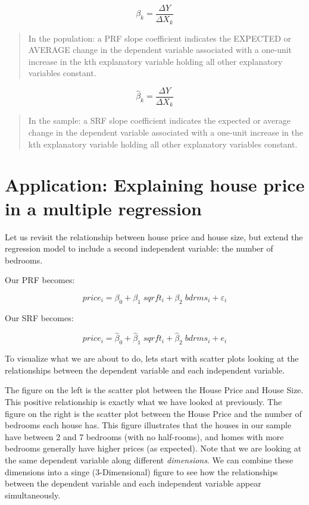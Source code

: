 \documentclass[
]{book}
\begin{document}
\[\beta_k=\frac{\Delta Y}{\Delta X_{k}}\]

\begin{quote}
In the population: a PRF slope coefficient indicates the EXPECTED or AVERAGE change in the dependent variable associated with a one-unit increase in the kth explanatory variable holding all other explanatory variables constant.
\end{quote}

\[\hat{\beta}_k=\frac{\Delta Y}{\Delta X_{k}}\]

\begin{quote}
In the sample: a SRF slope coefficient indicates the expected or average change in the dependent variable associated with a one-unit increase in the kth explanatory variable holding all other explanatory variables constant.
\end{quote}

\section{Application: Explaining house price in a multiple regression}\label{application-explaining-house-price-in-a-multiple-regression}

Let us revisit the relationship between house price and house size, but extend the regression model to include a second independent variable: the number of bedrooms.

Our PRF becomes:

\[price_i=\beta_0+\beta_1 \;sqrft_i+\beta_2 \;bdrms_i+\varepsilon_i\]

Our SRF becomes:

\[price_i=\hat{\beta}_0+\hat{\beta}_1 \;sqrft_i+\hat{\beta}_2 \;bdrms_i+e_i\]

To visualize what we are about to do, lets start with scatter plots looking at the relationships between the dependent variable and each independent variable.

The figure on the left is the scatter plot between the House Price and House Size. This positive relationship is exactly what we have looked at previously. The figure on the right is the scatter plot between the House Price and the number of bedrooms each house has. This figure illustrates that the houses in our sample have between 2 and 7 bedrooms (with no half-rooms), and homes with more bedrooms generally have higher prices (as expected). Note that we are looking at the same dependent variable along different \emph{dimensions}. We can combine these dimensions into a singe (3-Dimensional) figure to see how the relationships between the dependent variable and each independent variable appear simultaneously.
\end{document}

